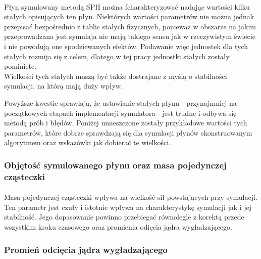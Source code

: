 \paragraph{}
Płyn symulowany metodą SPH można fcharakteryzować nadając wartości kilku stałych opisujących ten płyn. Niektórych wartości parametrów nie można jednak przepisać bezpośrednio z tablic stałych fizycznych, ponieważ w obszarze na jakim przeprowadzana jest symulaja nie mają takiego sensu jak w rzeczywistym świecie i nie powodują one spodziewanych efektów. Podawanie więc jednostek dla tych stałych rozmija się z celem, dlatego w tej pracy jednostki stałych zostały pominięte.\\
Wielkości tych stałych muszą być także dostrajane z myślą o stabilności symulacji, na którą mają duży wpływ. 
\par
Powyższe kwestie sprawiają, że ustawianie stałych płynu - przynajmniej na początkowych etapach implementacji symulatora - jest trudne i odbywa się metodą prób i błędów. Poniżej umieszczone zostały przykładowe wartości tych parametrów, które dobrze sprawdzają się dla symulacji płynów skonstruowanym algorytmem oraz wskazówki jak dobierać te wielkości.
\par

\subsubsection{Objętość symulowanego płynu oraz masa pojedynczej cząsteczki}

\paragraph{}
Masa pojedynczej cząsteczki wpływa na wielkość sił powstających przy symulacji. Ten parametr jest czuły i istotnie wpływa na charakterystykę symulacji jak i jej stabilność. Jego dopasowanie powinno przebiegać równolegle z korektą przede wszystkim kroku czasowego oraz promienia odięcia jądra wygładzającego.
\par

\subsubsection{Promień odcięcia jądra wygładzającego}

